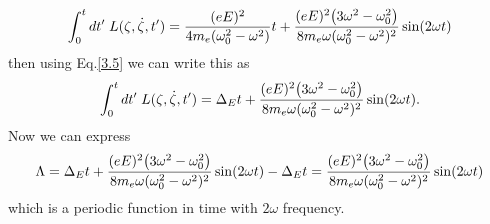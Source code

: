 \begin{equation} \label{3.10}
    \int_0^t dt' \; L(\zeta,\dot{\zeta},t')  =
    \frac{(eE)^2}{4m_e(\omega_0^2 - \omega^2)}t
    +
    \frac{(eE)^2\qty(3\omega^2 - \omega_0^2)}{8m_e\omega(\omega_0^2 - \omega^2)^2}
    \sin(2\omega t)
\end{equation}
then using Eq.\eqref{3.5} we can write this as
\begin{equation} \label{3.11}
    \int_0^t dt' \; L(\zeta,\dot{\zeta},t')  =
    \Delta_E t
    +
    \frac{(eE)^2\qty(3\omega^2 - \omega_0^2)}{8m_e\omega(\omega_0^2 - \omega^2)^2}
    \sin(2\omega t).
\end{equation}
Now we can express
\begin{equation} \label{3.12}
    \Lambda  =
    \Delta_E t
    +
    \frac{(eE)^2\qty(3\omega^2 - \omega_0^2)}{8m_e\omega(\omega_0^2 - \omega^2)^2}
    \sin(2\omega t) - \Delta_E t
    =
    \frac{(eE)^2\qty(3\omega^2 - \omega_0^2)}{8m_e\omega(\omega_0^2 - \omega^2)^2} \sin(2\omega t)
\end{equation}
which is a periodic function in time with $2\omega$ frequency.

